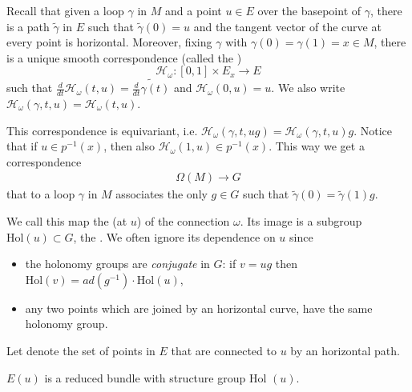 Recall that given a loop $\gamma$ in $M$ and a point $u\in E$ over the basepoint of $\gamma$, there is a path $\tilde{\gamma}$ in $E$ such that $\tilde{\gamma}(0)=u$ and the tangent vector of the curve at every point is horizontal. Moreover, fixing $\gamma$ with $\gamma(0)=\gamma(1)=x\in M$, there is a unique smooth correspondence (called the )
\[ \mathcal{H}_\omega : [0,1]\times E_x\rightarrow E \]
such that $\frac{d}{dt}\mathcal{H}_\omega (t,u)=\widetilde{\frac{d}{dt}\gamma(t)}$ and $\mathcal{H}_\omega(0,u)=u$. We also write $\mathcal{H}_\omega(\gamma,t,u)=\mathcal{H}_\omega(t,u)$.

This correspondence is  equivariant, i.e. $\mathcal{H}_\omega(\gamma,t,ug)=\mathcal{H}_\omega(\gamma,t,u)g$.
 Notice that if $u\in p^{-1}(x)$, then also $\mathcal{H}_\omega(1,u) \in p^{-1}(x)$. This way we get a correspondence 
\begin{align*}
 \Omega(M)\rightarrow G
\end{align*}
that to a loop $\gamma$ in $M$ associates the only $g\in G$ such that $\widetilde{\gamma}(0)=\widetilde{\gamma}(1)g$. 

We call this map the  (at $u$) of the connection $\omega$. Its image is a subgroup  $\text{Hol}(u)\subset G$, the . We often ignore its dependence on $u$ since \begin{itemize}
\item the holonomy groups are \emph{conjugate} in $G$: if $v=ug$ then $\text{Hol}(v)=ad(g^{-1})\cdotp\text{Hol}(u)$,
\item any two points which are joined by an horizontal curve, have the same holonomy group.                                                                                                                                                                                                                                                          \end{itemize}



Let  denote the set of points in $E$ that are connected to $u$ by an horizontal path.
\begin{theorem}\label{redthm}
$E(u)$ is a reduced bundle with structure group $\text{Hol }(u)$.
\end{theorem}


